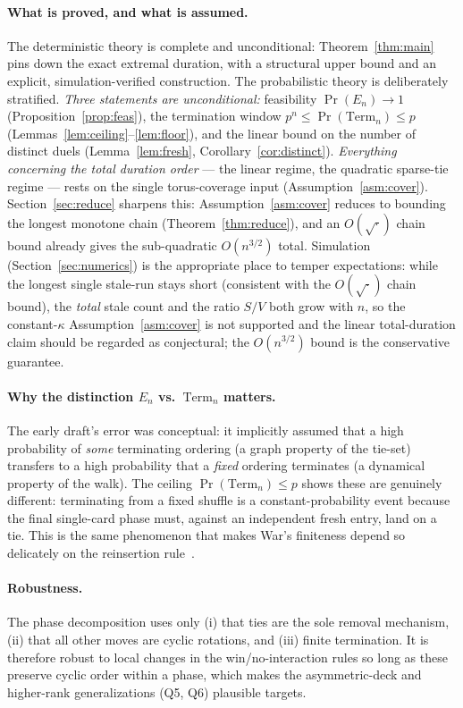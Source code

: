 \documentclass[11pt]{article}
\theoremstyle{definition}
\theoremstyle{remark}
\newcommand{\Term}{\mathrm{Term}}
\begin{document}
\paragraph{What is proved, and what is assumed.}
The deterministic theory is complete and unconditional: Theorem~\ref{thm:main} pins down the exact extremal duration, with
a structural upper bound and an explicit, simulation-verified construction. The probabilistic theory is deliberately
stratified. \emph{Three statements are unconditional:} feasibility $\Pr(E_n) \to 1$ (Proposition~\ref{prop:feas}), the
termination window $p^n \le \Pr(\Term_n) \le p$ (Lemmas~\ref{lem:ceiling}--\ref{lem:floor}), and the linear bound on the
number of distinct duels (Lemma~\ref{lem:fresh}, Corollary~\ref{cor:distinct}). \emph{Everything concerning the total
duration order} --- the linear regime, the quadratic sparse-tie regime --- rests on the single torus-coverage input
(Assumption~\ref{asm:cover}). Section~\ref{sec:reduce} sharpens this: Assumption~\ref{asm:cover} reduces to bounding the
longest monotone chain (Theorem~\ref{thm:reduce}), and an $O(\sqrt\cdot)$ chain bound already gives the sub-quadratic
$O(n^{3/2})$ total. Simulation (Section~\ref{sec:numerics}) is the appropriate place to temper expectations: while the
longest single stale-run stays short (consistent with the $O(\sqrt\cdot)$ chain bound), the \emph{total} stale count and
the ratio $S/V$ both grow with $n$, so the constant-$\kappa$ Assumption~\ref{asm:cover} is not supported and the linear
total-duration claim should be regarded as conjectural; the $O(n^{3/2})$ bound is the conservative guarantee.

\paragraph{Why the distinction $E_n$ vs.\ $\Term_n$ matters.}
The early draft's error was conceptual: it implicitly assumed that a high probability of \emph{some} terminating ordering (a
graph property of the tie-set) transfers to a high probability that a \emph{fixed} ordering terminates (a dynamical
property of the walk). The ceiling $\Pr(\Term_n) \le p$ shows these are genuinely different: terminating from a fixed
shuffle is a constant-probability event because the final single-card phase must, against an independent fresh entry, land
on a tie. This is the same phenomenon that makes War's finiteness depend so delicately on the reinsertion rule~\cite{LR}.

\paragraph{Robustness.}
The phase decomposition uses only (i) that ties are the sole removal mechanism, (ii) that all other moves are cyclic
rotations, and (iii) finite termination. It is therefore robust to local changes in the win/no-interaction rules so long as
these preserve cyclic order within a phase, which makes the asymmetric-deck and higher-rank generalizations (Q5, Q6)
plausible targets.
\end{document}
